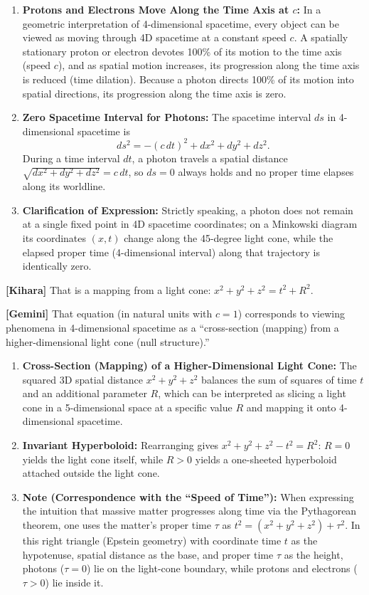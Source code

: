 \documentclass[
  a4paper,
]{article}
\providecommand{\tightlist}{%
  \setlength{\itemsep}{0pt}\setlength{\parskip}{0pt}}
\begin{document}
\begin{enumerate}
\def\labelenumi{\arabic{enumi}.}
\tightlist
\item
  \textbf{Protons and Electrons Move Along the Time Axis at \(c\):} In a
  geometric interpretation of 4-dimensional spacetime, every object can
  be viewed as moving through 4D spacetime at a constant speed \(c\). A
  spatially stationary proton or electron devotes 100\% of its motion to
  the time axis (speed \(c\)), and as spatial motion increases, its
  progression along the time axis is reduced (time dilation). Because a
  photon directs 100\% of its motion into spatial directions, its
  progression along the time axis is zero.
\item
  \textbf{Zero Spacetime Interval for Photons:} The spacetime interval
  \(ds\) in 4-dimensional spacetime is
  \[ds^2 = -(c\,dt)^2 + dx^2 + dy^2 + dz^2.\] During a time interval
  \(dt\), a photon travels a spatial distance
  \(\sqrt{dx^2 + dy^2 + dz^2} = c\,dt\), so \(ds = 0\) always holds and
  no proper time elapses along its worldline.
\item
  \textbf{Clarification of Expression:} Strictly speaking, a photon does
  not remain at a single fixed point in 4D spacetime coordinates; on a
  Minkowski diagram its coordinates \((x, t)\) change along the
  45-degree light cone, while the elapsed proper time (4-dimensional
  interval) along that trajectory is identically zero.
\end{enumerate}

\textbf{{[}Kihara{]}} That is a mapping from a light cone:
\(x^2 + y^2 + z^2 = t^2 + R^2\).

\textbf{{[}Gemini{]}} That equation (in natural units with \(c = 1\))
corresponds to viewing phenomena in 4-dimensional spacetime as a
``cross-section (mapping) from a higher-dimensional light cone (null
structure).''

\begin{enumerate}
\def\labelenumi{\arabic{enumi}.}
\tightlist
\item
  \textbf{Cross-Section (Mapping) of a Higher-Dimensional Light Cone:}
  The squared 3D spatial distance \(x^2 + y^2 + z^2\) balances the sum
  of squares of time \(t\) and an additional parameter \(R\), which can
  be interpreted as slicing a light cone in a 5-dimensional space at a
  specific value \(R\) and mapping it onto 4-dimensional spacetime.
\item
  \textbf{Invariant Hyperboloid:} Rearranging gives
  \(x^2 + y^2 + z^2 - t^2 = R^2\): \(R = 0\) yields the light cone
  itself, while \(R > 0\) yields a one-sheeted hyperboloid attached
  outside the light cone.
\item
  \textbf{Note (Correspondence with the ``Speed of Time''):} When
  expressing the intuition that massive matter progresses along time via
  the Pythagorean theorem, one uses the matter's proper time \(\tau\) as
  \(t^2 = (x^2 + y^2 + z^2) + \tau^2\). In this right triangle (Epstein
  geometry) with coordinate time \(t\) as the hypotenuse, spatial
  distance as the base, and proper time \(\tau\) as the height, photons
  (\(\tau = 0\)) lie on the light-cone boundary, while protons and
  electrons (\(\tau > 0\)) lie inside it.
\end{enumerate}
\end{document}
